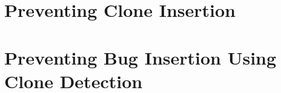 

\chapter{Preventing Clone Insertion\label{chap:clone-detection-pragmatic}}




\chapter{Preventing Bug Insertion Using Clone Detection\label{chap:bianca}}



%
% 

